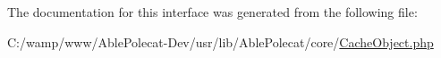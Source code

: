 


The documentation for this interface was generated from the following file\+:\begin{DoxyCompactItemize}
\item 
C\+:/wamp/www/\+Able\+Polecat-\/\+Dev/usr/lib/\+Able\+Polecat/core/\hyperlink{_cache_object_8php}{Cache\+Object.\+php}\end{DoxyCompactItemize}
